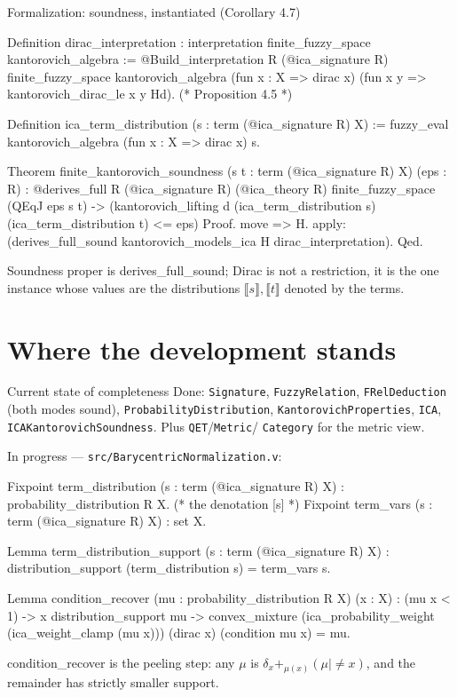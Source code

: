 \documentclass[10pt,aspectratio=169]{beamer}
\newcommand{\den}[1]{\llbracket #1 \rrbracket}
\newcommand{\bpl}[1]{+_{#1}}
\newcommand{\file}[1]{{\color{rocqcon}\texttt{#1}}}
\newcommand{\rid}[1]{{\ttfamily\small #1}}
\begin{document}
\begin{frame}[fragile]{Formalization: soundness, instantiated (Corollary 4.7)}
  \begin{srcbox}
Definition dirac_interpretation :
    interpretation finite_fuzzy_space kantorovich_algebra :=
  @Build_interpretation R (@ica_signature R)
    finite_fuzzy_space kantorovich_algebra
    (fun x : X => dirac x)
    (fun x y => kantorovich_dirac_le x y Hd).   (* Proposition 4.5 *)

Definition ica_term_distribution (s : term (@ica_signature R) X) :=
  fuzzy_eval kantorovich_algebra (fun x : X => dirac x) s.

Theorem finite_kantorovich_soundness (s t : term (@ica_signature R) X) (eps : R) :
  @derives_full R (@ica_signature R) (@ica_theory R)
    finite_fuzzy_space (QEqJ eps s t) ->
  (kantorovich_lifting d (ica_term_distribution s)
                         (ica_term_distribution t) <= eps)%
Proof.
  move => H.
  apply: (derives_full_sound kantorovich_models_ica H dirac_interpretation).
Qed.
  \end{srcbox}
  Soundness proper is \rid{derives\_full\_sound}; Dirac is not a
  restriction, it is the one instance whose values are the
  distributions $\den{s},\den{t}$ denoted by the terms.
\end{frame}

\section{Where the development stands}

\begin{frame}[fragile]{Current state of completeness}
  Done: \file{Signature}, \file{FuzzyRelation}, \file{FRelDeduction}
  (both modes sound), \file{ProbabilityDistribution},
  \file{KantorovichProperties}, \file{ICA},
  \file{ICAKantorovichSoundness}. Plus \file{QET}/\file{Metric}/%
  \file{Category} for the metric view.
  \medskip

  In progress --- \file{src/BarycentricNormalization.v}:
  \begin{srcbox}
Fixpoint term_distribution (s : term (@ica_signature R) X)
  : probability_distribution R X.       (* the denotation [s] *)
Fixpoint term_vars (s : term (@ica_signature R) X) : {set X}.

Lemma term_distribution_support (s : term (@ica_signature R) X) :
  distribution_support (term_distribution s) = term_vars s.

Lemma condition_recover (mu : probability_distribution R X) (x : X) :
  (mu x < 1) -> x \in distribution_support mu ->
  convex_mixture (ica_probability_weight (ica_weight_clamp (mu x)))
    (dirac x) (condition mu x) = mu.
  \end{srcbox}
  \rid{condition\_recover} is the peeling step: any $\mu$ is
  $\delta_x \bpl{\mu(x)} (\mu \mid {\neq} x)$, and the remainder has
  strictly smaller support.
\end{frame}
\end{document}
